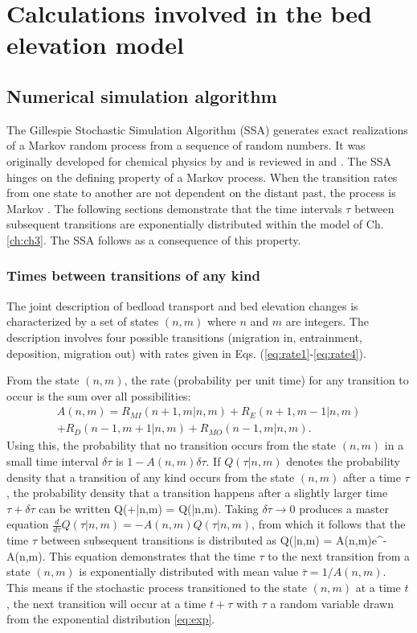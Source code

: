 

\chapter{Calculations involved in the bed elevation model}
\label{ch:gill}
\section{Numerical simulation algorithm}
\label{sec:arr}
The Gillespie Stochastic Simulation Algorithm (SSA) generates exact realizations of a Markov random process from a sequence of random numbers.
It was originally developed for chemical physics by \citet{Gillespie1977} and is reviewed in \citet{Gillespie1991} and \citet{Gillespie2007}.
The SSA hinges on the defining property of a Markov process. When the transition rates from one state to another are not dependent on the distant past, the process is Markov \citep{Cox1965}.
The following sections demonstrate that the time intervals $\tau$ between subsequent transitions are exponentially distributed within the model of Ch. \ref{ch:ch3}. The SSA follows as a consequence of this property.

\subsection{Times between transitions of any kind}
The joint description of bedload transport and bed elevation changes is characterized by a set of states $(n,m)$ where $n$ and $m$ are integers.
The description involves four possible transitions (migration in, entrainment, deposition, migration out) with rates given in Eqs. (\ref{eq:rate1}-\ref{eq:rate4}).

From the state $(n,m)$, the rate (probability per unit time) for any transition to occur is the sum over all possibilities:
\begin{multline} A(n,m) = R_{MI}(n+1,m|n,m) + R_E(n+1,m-1|n,m) \\+ R_D(n-1,m+1|n,m) + R_{MO}(n-1,m|n,m).\end{multline}
Using this, the probability that no transition occurs from the state $(n,m)$ in a small time interval $\delta \tau$ is $1-A(n,m)\delta \tau$. If $Q(\tau|n,m)$ denotes the probability density that a transition of any kind occurs from the state $(n,m)$ after a time $\tau$, the probability density that a transition happens after a slightly larger time $\tau + \delta \tau$ can be written
\be Q(\tau+\delta \tau|n,m) = Q(\tau|n,m).\ee
Taking $\delta\tau \rightarrow 0 $ produces a master equation $\frac{d}{d\tau}Q(\tau|n,m) = -A(n,m)Q(\tau|n,m)$, from which it follows that the time $\tau$ between subsequent transitions is distributed as 
\be Q(\tau|n,m) = A(n,m)e^{-A(n,m)\tau}. \label{eq:exp}\ee
This equation demonstrates that the time $\tau$ to the next transition from a state $(n,m)$ is exponentially distributed with mean value $\bar{\tau} = 1/A(n,m).$ This means if the stochastic process transitioned to the state $(n,m)$ at a time $t$, the next transition will occur at a time $t+\tau$ with $\tau$ a random variable drawn from the exponential distribution \ref{eq:exp}.

